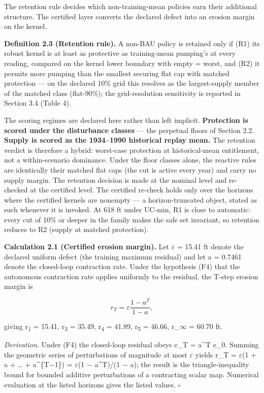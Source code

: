 \documentclass[11pt]{article}
\begin{document}
The retention rule decides which non-training-mean policies earn their
additional structure. The certified layer converts the declared defect
into an erosion margin on the kernel.

\textbf{Definition 2.3 (Retention rule).} A non-BAU policy is retained
only if (R1) its robust kernel is at least as protective as
training-mean pumping's at every reading, compared on the kernel lower
boundary with empty = worst, and (R2) it permits more pumping than the
smallest securing flat cap with matched protection --- on the declared
10\% grid this resolves as the largest-supply member of the matched
class (flat-90\%); the grid-resolution sensitivity is reported in
Section 3.4 (Table 4).

The scoring regimes are declared here rather than left implicit.
\textbf{Protection is scored under the disturbance classes} --- the
perpetual floors of Section 2.2. \textbf{Supply is scored as the
1934--1990 historical replay mean.} The retention verdict is therefore a
hybrid: worst-case protection at historical-mean entitlement, not a
within-scenario dominance. Under the floor classes alone, the reactive
rules are identically their matched flat caps (the cut is active every
year) and carry no supply margin. The retention decision is made at the
nominal level and re-checked at the certified level. The certified
re-check holds only over the horizons where the certified kernels are
nonempty --- a horizon-truncated object, stated as such whenever it is
invoked. At 618 ft under UC-min, R1 is close to automatic: every cut of
10\% or deeper in the family makes the safe set invariant, so retention
reduces to R2 (supply at matched protection).

\textbf{Calculation 2.1 (Certified erosion margin).} Let \ensuremath{\varepsilon} = 15.41 ft
denote the declared uniform defect (the training maximum residual) and
let a = 0.7461 denote the closed-loop contraction rate. Under the
hypothesis (F4) that the autonomous contraction rate applies uniformly
to the residual, the T-step erosion margin is

\[r_T = \varepsilon \frac{1 - a^T}{1 - a},\]

giving r\textsubscript{1} = 15.41, r\textsubscript{3} = 35.49, r\textsubscript{4} = 41.89, r\textsubscript{5} = 46.66, r\_\ensuremath{\infty} = 60.70 ft.

\emph{Derivation.} Under (F4) the closed-loop residual obeys e\_T =
a\^{}T e\_0. Summing the geometric series of perturbations of magnitude
at most \ensuremath{\varepsilon} yields r\_T = \ensuremath{\varepsilon}(1 + a + \ldots{} + a\^{}\{T\ensuremath{-}1\}) = \ensuremath{\varepsilon}(1 \ensuremath{-}
a\^{}T)/(1 \ensuremath{-} a); the result is the triangle-inequality bound for bounded
additive perturbations of a contracting scalar map. Numerical evaluation
at the listed horizons gives the listed values. \ensuremath{\square}
\end{document}
